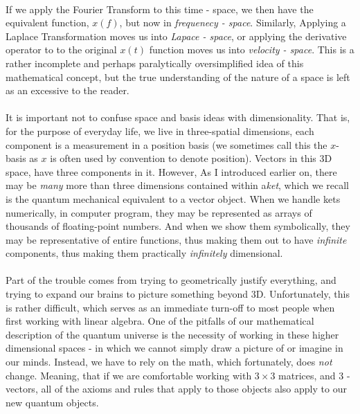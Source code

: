 \documentclass[12pt,letterpaper]{book}
\begin{document}
\paragraph*{}If we apply the Fourier Transform to this time - space, we then have the equivalent function, $x(f)$, but now in \textit{frequenecy - space}. Similarly, Applying a Laplace Transformation moves us into \textit{Lapace - space}, or applying the derivative operator to to the original $x(t)$ function moves us into \textit{velocity - space}. This is a rather incomplete and perhaps paralytically oversimplified idea of this mathematical concept, but the true understanding of the nature of a space is left as an excessive to the reader.

\paragraph*{}It is important not to confuse space and basis ideas with dimensionality. That is, for the purpose of everyday life, we live in three-spatial dimensions, each component is a measurement in a position basis (we sometimes call this the $x$-basis as $x$ is often used by convention to denote position). Vectors in this 3D space, have three components in it. However, As I introduced earlier on, there may be \textit{many} more than three dimensions contained within a\textit{ket}, which we recall is the quantum mechanical equivalent to a vector object. When we handle kets numerically, in computer program, they may be represented as arrays of thousands of floating-point numbers. And when we show them symbolically, they may be representative of entire functions, thus making them out to have \textit{infinite} components, thus making them practically \textit{infinitely} dimensional.

\paragraph*{}Part of the trouble comes from trying to geometrically justify everything, and trying to expand our brains to picture something beyond 3D. Unfortunately, this is rather difficult, which serves as an immediate turn-off to most people when first working with linear algebra. One of the pitfalls of our mathematical description of the quantum universe is the necessity of working in these higher dimensional spaces - in which we cannot simply draw a picture of or imagine in our minds. Instead, we have to rely on the math, which fortunately, does \textit{not} change. Meaning, that if we are comfortable working with $3 \times 3$ matrices, and 3 -vectors, all of the axioms and rules that apply to those objects also apply to our new quantum objects.
\end{document}

